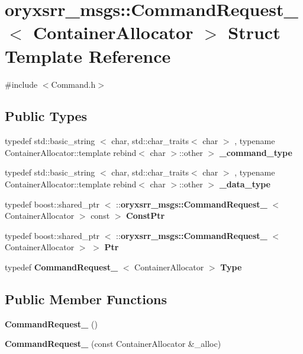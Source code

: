 \section{oryxsrr\-\_\-msgs\-:\-:\-Command\-Request\-\_\-$<$ \-Container\-Allocator $>$ \-Struct \-Template \-Reference}
\label{structoryxsrr__msgs_1_1CommandRequest__}


{\ttfamily \#include $<$\-Command.\-h$>$}

\subsection*{\-Public \-Types}
\begin{DoxyCompactItemize}
\item 
typedef std\-::basic\-\_\-string\*
$<$ char, std\-::char\-\_\-traits$<$ char $>$\*
, typename \*
\-Container\-Allocator\-::template \*
rebind$<$ char $>$\-::other $>$ {\bf \-\_\-command\-\_\-type}
\item 
typedef std\-::basic\-\_\-string\*
$<$ char, std\-::char\-\_\-traits$<$ char $>$\*
, typename \*
\-Container\-Allocator\-::template \*
rebind$<$ char $>$\-::other $>$ {\bf \-\_\-data\-\_\-type}
\item 
typedef boost\-::shared\-\_\-ptr\*
$<$ \-::{\bf oryxsrr\-\_\-msgs\-::\-Command\-Request\-\_\-}\*
$<$ \-Container\-Allocator $>$ const  $>$ {\bf \-Const\-Ptr}
\item 
typedef boost\-::shared\-\_\-ptr\*
$<$ \-::{\bf oryxsrr\-\_\-msgs\-::\-Command\-Request\-\_\-}\*
$<$ \-Container\-Allocator $>$ $>$ {\bf \-Ptr}
\item 
typedef {\bf \-Command\-Request\-\_\-}\*
$<$ \-Container\-Allocator $>$ {\bf \-Type}
\end{DoxyCompactItemize}
\subsection*{\-Public \-Member \-Functions}
\begin{DoxyCompactItemize}
\item 
{\bf \-Command\-Request\-\_\-} ()
\item 
{\bf \-Command\-Request\-\_\-} (const \-Container\-Allocator \&\-\_\-alloc)
\end{DoxyCompactItemize}
